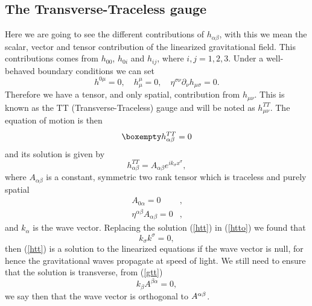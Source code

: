 \subsection{The Transverse-Traceless gauge}

Here we are going to see the different contributions of $h_{\alpha\beta}$,
with this we mean the scalar, vector and tensor contribution of the
linearized gravitational field. This contributions comes from $h_{00}$,
$h_{0i}$ and $h_{ij}$, where $i,j=1,2,3$. Under a well-behaved
boundary conditions we can set
\begin{equation}
h^{0\mu}=0,\hspace{1em}h_{\mu}^{\mu}=0,\hspace{1em}\eta^{\sigma\nu}\partial_{\nu}h_{\mu\sigma}=0.\label{gtt}
\end{equation}
Therefore we have a tensor, and only spatial, contribution from $h_{\mu\nu}$.
This is known as the TT (Transverse-Traceless) gauge and will be noted
as $h_{\mu\nu}^{TT}$. The equation of motion is then
\begin{equation}
\boxempty h_{\alpha\beta}^{TT}=0\label{htto}
\end{equation}
and its solution is given by 
\begin{equation}
h_{\alpha\beta}^{TT}=A_{\alpha\beta}e^{ik_{\sigma}x^{\sigma}},\label{htt}
\end{equation}
where $A_{\alpha\beta}$ is a constant, symmetric two rank tensor
which is traceless and purely spatial
\[
\begin{array}{rl}
A_{0\alpha}=0 & ,\\
\eta^{\alpha\beta}A_{\alpha\beta}=0 & ,
\end{array}
\]
and $k_{\alpha}$ is the wave vector. Replacing the solution (\ref{htt})
in (\ref{htto}) we found that
\[
k_{\sigma}k^{\sigma}=0,
\]
then (\ref{htt}) is a solution to the linearized equations if the
wave vector is null, for hence the gravitational waves propagate at
speed of light. We still need to ensure that the solution is transverse,
from (\ref{gtt})
\begin{equation}
k_{\beta}A^{\beta\alpha}=0,\label{kc}
\end{equation}
we say then that the wave vector is orthogonal to $A^{\alpha\text{\ensuremath{\beta}}}$.

